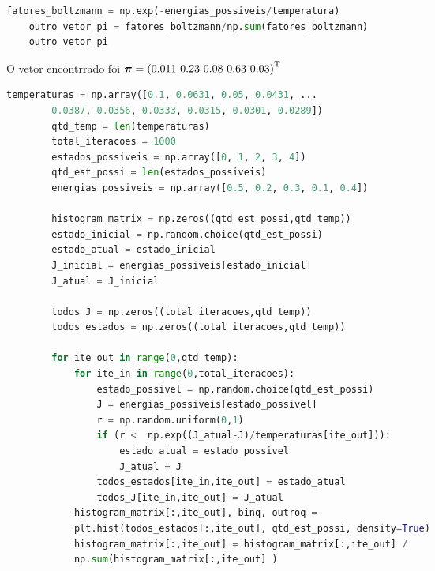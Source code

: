 \documentclass{homeworkclass}
\begin{document}
\begin{homeworkProblem}
\begin{homeworkSection}
\end{homeworkSection}

\begin{homeworkSection}[d) Calcule os fatores de Boltzmann (ou seja, $e^{-(J(x)/T)}$) associados aos dados da tabela acima, e compare-os com o resultado do item (c). Use $T = 0.1$.]

\begin{lstlisting}[language=Python]
	fatores_boltzmann = np.exp(-energias_possiveis/temperatura)
	outro_vetor_pi = fatores_boltzmann/np.sum(fatores_boltzmann)
	outro_vetor_pi
\end{lstlisting}
O vetor encontrrado foi $\boldsymbol{\pi} = \left( 0.011 \, \, 0.23 \, \, 0.08 \, \, 0.63 \, \, 0.03 \right)^{\mathrm{T}}$

\end{homeworkSection}

\begin{homeworkSection}

	\begin{lstlisting}[language=Python]
		temperaturas = np.array([0.1, 0.0631, 0.05, 0.0431, ...
		0.0387, 0.0356, 0.0333, 0.0315, 0.0301, 0.0289])
		qtd_temp = len(temperaturas)
		total_iteracoes = 1000
		estados_possiveis = np.array([0, 1, 2, 3, 4])
		qtd_est_possi = len(estados_possiveis)
		energias_possiveis = np.array([0.5, 0.2, 0.3, 0.1, 0.4])

		histogram_matrix = np.zeros((qtd_est_possi,qtd_temp))
		estado_inicial = np.random.choice(qtd_est_possi)
		estado_atual = estado_inicial
		J_inicial = energias_possiveis[estado_inicial]
		J_atual = J_inicial

		todos_J = np.zeros((total_iteracoes,qtd_temp))
		todos_estados = np.zeros((total_iteracoes,qtd_temp))

		for ite_out in range(0,qtd_temp):
			for ite_in in range(0,total_iteracoes):
				estado_possivel = np.random.choice(qtd_est_possi)
				J = energias_possiveis[estado_possivel]
				r = np.random.uniform(0,1)
				if (r <  np.exp((J_atual-J)/temperaturas[ite_out])):
					estado_atual = estado_possivel
					J_atual = J
				todos_estados[ite_in,ite_out] = estado_atual
				todos_J[ite_in,ite_out] = J_atual
			histogram_matrix[:,ite_out], binq, outroq =
			plt.hist(todos_estados[:,ite_out], qtd_est_possi, density=True)
			histogram_matrix[:,ite_out] = histogram_matrix[:,ite_out] /
			np.sum(histogram_matrix[:,ite_out] )
	\end{lstlisting}



\end{homeworkSection}
\end{homeworkProblem}
\end{document}
